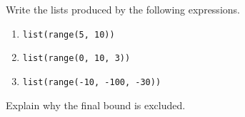 Write the lists produced by the following expressions.
\begin{enumerate}
\item \texttt{list(range(5, 10))}
\item \texttt{list(range(0, 10, 3))}
\item \texttt{list(range(-10, -100, -30))}
\end{enumerate}
Explain why the final bound is excluded.
